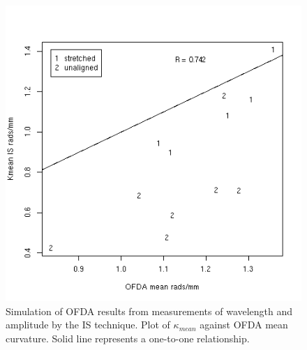 %

\begin{figure}[!h]
  \centering
  \includegraphics[width=1.0\textwidth]{figofdasimismean.png}
  \caption{Simulation of OFDA results from measurements of wavelength and amplitude by the IS technique. Plot of $\kappa_{mean}$ against OFDA mean curvature. Solid line represents a one-to-one relationship.}
\label{fig:ofdasimismean}
\end{figure}

%

